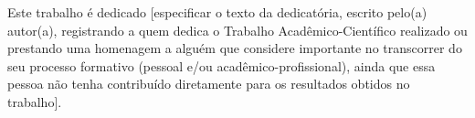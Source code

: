 \vspace*{\fill}

\hspace{\fill}
\begin{minipage}{12cm}
    \setlength{\parindent}{1.25cm}
    
    \noindent Este trabalho é dedicado [especificar o texto da dedicatória, escrito pelo(a) autor(a), registrando a quem dedica o Trabalho Acadêmico-Científico realizado ou prestando uma homenagem a alguém que considere importante no transcorrer do seu processo formativo (pessoal e/ou acadêmico-profissional), ainda que essa pessoa não tenha contribuído diretamente para os resultados obtidos no trabalho].
\end{minipage}

\OnesideTwoside{\clearpage}{\cleardoublepage}
